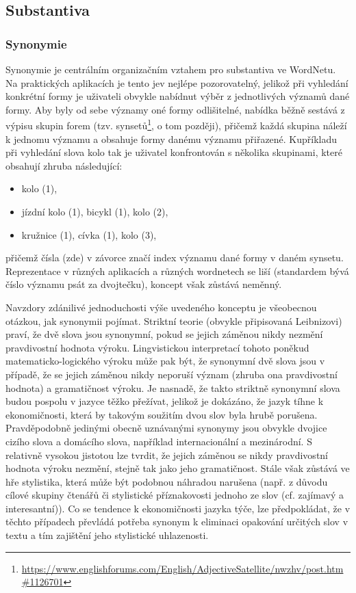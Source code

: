 \documentclass[a4paper, 11pt, oneside]{book}
\newcommand\ex{\textsf}
\begin{document}
			\subsection{Substantiva}


				\subsubsection{Synonymie}

					Synonymie je centrálním organizačním vztahem pro substantiva ve WordNetu. Na praktických aplikacích je tento jev nejlépe pozorovatelný, jelikož při vyhledání konkrétní formy je uživateli obvykle nabídnut výběr z jednotlivých významů dané formy. Aby byly od sebe významy oné formy odlišitelné, nabídka běžně sestává z výpisu skupin forem (tzv. synsetů\footnote{\url{https://www.englishforums.com/English/AdjectiveSatellite/nwzhv/post.htm#1126701}}, o tom později), přičemž každá skupina náleží k jednomu významu a obsahuje formy danému významu přiřazené. Kupříkladu při vyhledání slova \ex{kolo} tak je uživatel konfrontován s několika skupinami, které obsahují zhruba následující:

					\begin{itemize}
						\item \ex{kolo (1)},
						\item \ex{jízdní kolo (1), bicykl (1), kolo (2)},
						\item \ex{kružnice (1), cívka (1), kolo (3)},
					\end{itemize}

					přičemž čísla (zde) v závorce značí index významu dané formy v daném synsetu. Reprezentace v různých aplikacích a různých wordnetech se liší (standardem bývá číslo významu psát za dvojtečku), koncept však zůstává neměnný. 

					Navzdory zdánilivé jednoduchosti výše uvedeného konceptu je všeobecnou otázkou, jak synonymii pojímat. Striktní teorie (obvykle připisovaná Leibnizovi) praví, že dvě slova jsou synonymní, pokud se jejich záměnou nikdy nezmění pravdivostní hodnota výroku. Lingvistickou interpretací tohoto poněkud matematicko-logického výroku může pak být, že synonymní dvě slova jsou v případě, že se jejich záměnou nikdy neporuší význam (zhruba ona pravdivostní hodnota) a gramatičnost výroku. Je nasnadě, že takto striktně synonymní slova budou pospolu v jazyce těžko přežívat, jelikož je dokázáno, že jazyk tíhne k ekonomičnosti, která by takovým soužitím dvou slov byla hrubě porušena. Pravděpodobně jedinými obecně uznávanými synonymy jsou obvykle dvojice cizího slova a domácího slova, například \ex{internacionální} a \ex{mezinárodní}. S relativně vysokou jistotou lze tvrdit, že jejich záměnou se nikdy pravdivostní hodnota výroku nezmění, stejně tak jako jeho gramatičnost. Stále však zůstává ve hře stylistika, která může být podobnou náhradou narušena (např. z důvodu cílové skupiny čtenářů či stylistické příznakovosti jednoho ze slov (cf. \ex{zajímavý} a \ex{interesantní})). Co se tendence k ekonomičnosti jazyka týče, lze předpokládat, že v těchto případech převládá potřeba synonym k eliminaci opakování určitých slov v textu a tím zajištění jeho stylistické uhlazenosti. 
\end{document}
